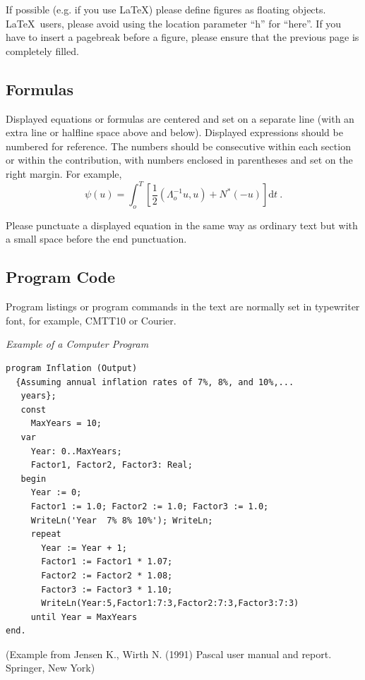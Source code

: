 \documentclass[runningheads]{llncs}
\begin{document}
If possible (e.g. if you use \LaTeX) please define figures as floating
objects. \LaTeX\ users, please avoid using the location
parameter ``h'' for ``here''. If you have to insert a pagebreak before a
figure, please ensure that the previous page is completely filled.

\subsection{Formulas}

Displayed equations or formulas are centered and set on a separate
line (with an extra line or halfline space above and below). Displayed
expressions should be numbered for reference. The numbers should be
consecutive within each section or within the contribution,
with numbers enclosed in parentheses and set on the right margin.
For example,
%
\begin{equation}
  \psi (u) = \int_{o}^{T} \left[\frac{1}{2}
  \left(\Lambda_{o}^{-1} u,u\right) + N^{\ast} (-u)\right] \mathrm{d}t~.
  \label{equ:dt}
\end{equation}

Please punctuate a displayed equation in the same way as ordinary
text but with a small space before the end punctuation.


\subsection{Program Code}

Program listings or program commands in the text are normally set in
typewriter font, for example, CMTT10 or Courier.

\medskip

\noindent
{\it Example of a Computer Program}
\begin{verbatim}
program Inflation (Output)
  {Assuming annual inflation rates of 7%, 8%, and 10%,...
   years};
   const
     MaxYears = 10;
   var
     Year: 0..MaxYears;
     Factor1, Factor2, Factor3: Real;
   begin
     Year := 0;
     Factor1 := 1.0; Factor2 := 1.0; Factor3 := 1.0;
     WriteLn('Year  7% 8% 10%'); WriteLn;
     repeat
       Year := Year + 1;
       Factor1 := Factor1 * 1.07;
       Factor2 := Factor2 * 1.08;
       Factor3 := Factor3 * 1.10;
       WriteLn(Year:5,Factor1:7:3,Factor2:7:3,Factor3:7:3)
     until Year = MaxYears
end.
\end{verbatim}
%
\noindent
{\small (Example from Jensen K., Wirth N. (1991) Pascal user manual and
report. Springer, New York)}
\end{document}
